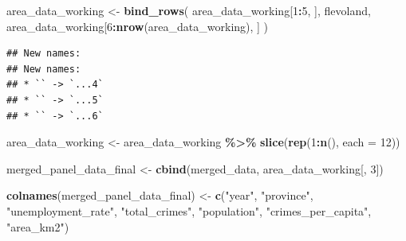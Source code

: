 \documentclass[
]{article}
\newenvironment{Shaded}{\begin{snugshade}}{\end{snugshade}}
\newcommand{\AttributeTok}[1]{\textcolor[rgb]{0.13,0.29,0.53}{#1}}
\newcommand{\DecValTok}[1]{\textcolor[rgb]{0.00,0.00,0.81}{#1}}
\newcommand{\FunctionTok}[1]{\textcolor[rgb]{0.13,0.29,0.53}{\textbf{#1}}}
\newcommand{\NormalTok}[1]{#1}
\newcommand{\OtherTok}[1]{\textcolor[rgb]{0.56,0.35,0.01}{#1}}
\newcommand{\SpecialCharTok}[1]{\textcolor[rgb]{0.81,0.36,0.00}{\textbf{#1}}}
\newcommand{\StringTok}[1]{\textcolor[rgb]{0.31,0.60,0.02}{#1}}
\begin{document}
\begin{Shaded}
\begin{Highlighting}[]
\NormalTok{area\_data\_working }\OtherTok{\textless{}{-}} \FunctionTok{bind\_rows}\NormalTok{(}
\NormalTok{  area\_data\_working[}\DecValTok{1}\SpecialCharTok{:}\DecValTok{5}\NormalTok{, ], flevoland,  }
\NormalTok{  area\_data\_working[}\DecValTok{6}\SpecialCharTok{:}\FunctionTok{nrow}\NormalTok{(area\_data\_working), ]}
\NormalTok{)}
\end{Highlighting}
\end{Shaded}

\begin{verbatim}
## New names:
## New names:
## * `` -> `...4`
## * `` -> `...5`
## * `` -> `...6`
\end{verbatim}

\begin{Shaded}
\begin{Highlighting}[]
\NormalTok{area\_data\_working }\OtherTok{\textless{}{-}}\NormalTok{ area\_data\_working }\SpecialCharTok{\%\textgreater{}\%}
  \FunctionTok{slice}\NormalTok{(}\FunctionTok{rep}\NormalTok{(}\DecValTok{1}\SpecialCharTok{:}\FunctionTok{n}\NormalTok{(), }\AttributeTok{each =} \DecValTok{12}\NormalTok{))}

\NormalTok{merged\_panel\_data\_final }\OtherTok{\textless{}{-}} \FunctionTok{cbind}\NormalTok{(merged\_data, area\_data\_working[, }\DecValTok{3}\NormalTok{])}

\FunctionTok{colnames}\NormalTok{(merged\_panel\_data\_final) }\OtherTok{\textless{}{-}} \FunctionTok{c}\NormalTok{(}\StringTok{"year"}\NormalTok{, }\StringTok{"province"}\NormalTok{, }\StringTok{"unemployment\_rate"}\NormalTok{, }\StringTok{"total\_crimes"}\NormalTok{, }\StringTok{"population"}\NormalTok{, }\StringTok{"crimes\_per\_capita"}\NormalTok{, }\StringTok{"area\_km2"}\NormalTok{)}
\end{Highlighting}
\end{Shaded}
\end{document}
